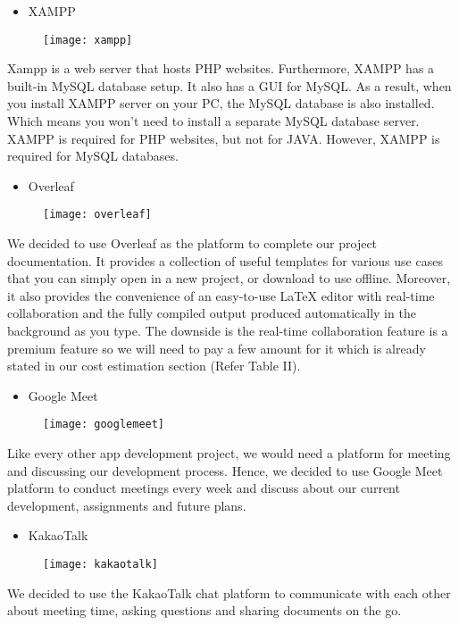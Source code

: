 \documentclass[conference]{IEEEtran}
\begin{document}
\begin{itemize}
\item XAMPP
\end{itemize}
\par \begin{figure}[h!]
\texttt{[image: xampp]}
\centering
\end{figure} Xampp is a web server that hosts PHP websites. Furthermore, XAMPP has a built-in MySQL database setup. It also has a GUI for MySQL. As a result, when you install XAMPP server on your PC, the MySQL database is also installed. Which means you won't need to install a separate MySQL database server. XAMPP is required for PHP websites, but not for JAVA. However, XAMPP is required for MySQL databases.\\
\begin{itemize}
\item Overleaf
\end{itemize}
\par \begin{figure}[h!]
\texttt{[image: overleaf]}
\centering
\end{figure} We decided to use Overleaf as the platform to complete our project documentation. It provides a collection of useful templates for various use cases that you can simply open in a new project, or download to use offline. Moreover, it also provides the convenience of an easy-to-use LaTeX editor with real-time collaboration and the fully compiled output produced automatically in the background as you type. The downside is the real-time collaboration feature is a premium feature so we will need to pay a few amount for it which is already stated in our cost estimation section (Refer Table II).\\
\begin{itemize}
\item Google Meet
\end{itemize}
\par \begin{figure}[h!]
\texttt{[image: googlemeet]}
\centering
\end{figure} Like every other app development project, we would need a platform for meeting and discussing our development process. Hence, we decided to use Google Meet platform to conduct meetings every week and discuss about our current development, assignments and future plans. \\
\begin{itemize}
\item KakaoTalk
\end{itemize}
\par \begin{figure}[h!]
\texttt{[image: kakaotalk]}
\centering
\end{figure} We decided to use the KakaoTalk chat platform to communicate with each other about meeting time, asking questions and sharing documents on the go. \\
\end{document}
